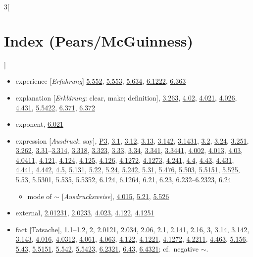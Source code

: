 \documentclass[oneside,openany,12pt]{book}
\newcommand{\indexentry}[1]{\item #1}
\newcommand{\indexsubentry}[1]{\begin{itemize} \item #1 \end{itemize}}
\newcommand{\indexref}[1]{\hyperlink{prop#1}{#1}}
\newcommand{\indexgap}{\bigskip}
\begin{document}
\begin{multicols}{3}[\section*{Index (Pears/McGuinness)}]
\begin{itemize}
   \indexsubentry{2. [\textit{Existenz}], \indexref{3.032}, \indexref{3.24}, \indexref{3.323}, \indexref{3.4}, \indexref{3.411}, \indexref{4.1274}, \indexref{5.5151}}

\indexentry{experience [\textit{Erfahrung}] \indexref{5.552}, \indexref{5.553}, \indexref{5.634}, \indexref{6.1222}, \indexref{6.363}}

\indexentry{explanation [\textit{Erkl{\"a}rung}: clear, make; definition], \indexref{3.263}, \indexref{4.02}, \indexref{4.021}, \indexref{4.026}, \indexref{4.431}, \indexref{5.5422}, \indexref{6.371}, \indexref{6.372}}

\indexentry{exponent, \indexref{6.021}}

\indexentry{expression [\textit{Ausdruck}: say], \hyperlink{pref3}{P3}, \indexref{3.1}, \indexref{3.12}, \indexref{3.13}, \indexref{3.142}, \indexref{3.1431}, \indexref{3.2}, \indexref{3.24}, \indexref{3.251}, \indexref{3.262}, \indexref{3.31}--\indexref{3.314}, \indexref{3.318}, \indexref{3.323}, \indexref{3.33}, \indexref{3.34}, \indexref{3.341}, \indexref{3.3441}, \indexref{4.002}, \indexref{4.013}, \indexref{4.03}, \indexref{4.0411}, \indexref{4.121}, \indexref{4.124}, \indexref{4.125}, \indexref{4.126}, \indexref{4.1272}, \indexref{4.1273}, \indexref{4.241}, \indexref{4.4}, \indexref{4.43}, \indexref{4.431}, \indexref{4.441}, \indexref{4.442}, \indexref{4.5}, \indexref{5.131}, \indexref{5.22}, \indexref{5.24}, \indexref{5.242}, \indexref{5.31}, \indexref{5.476}, \indexref{5.503}, \indexref{5.5151}, \indexref{5.525}, \indexref{5.53}, \indexref{5.5301}, \indexref{5.535}, \indexref{5.5352}, \indexref{6.124}, \indexref{6.1264}, \indexref{6.21}, \indexref{6.23}, \indexref{6.232}--\indexref{6.2323}, \indexref{6.24}}

    \indexsubentry{mode of $\sim$ [\textit{Ausdrucksweise}], \indexref{4.015}, \indexref{5.21}, \indexref{5.526}}

\indexentry{external, \indexref{2.01231}, \indexref{2.0233}, \indexref{4.023}, \indexref{4.122}, \indexref{4.1251}}

\indexgap

\indexentry{fact [Tatsache], \indexref{1.1}--\indexref{1.2}, \indexref{2}, \indexref{2.0121}, \indexref{2.034}, \indexref{2.06}, \indexref{2.1}, \indexref{2.141}, \indexref{2.16}, \indexref{3}, \indexref{3.14}, \indexref{3.142}, \indexref{3.143}, \indexref{4.016}, \indexref{4.0312}, \indexref{4.061}, \indexref{4.063}, \indexref{4.122}, \indexref{4.1221}, \indexref{4.1272}, \indexref{4.2211}, \indexref{4.463}, \indexref{5.156}, \indexref{5.43}, \indexref{5.5151}, \indexref{5.542}, \indexref{5.5423}, \indexref{6.2321}, \indexref{6.43}, \indexref{6.4321}; cf.\ negative $\sim$.}


\end{itemize}
\end{multicols}
\end{document}
